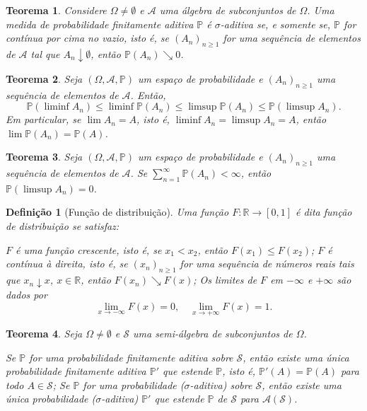 \documentclass[12pt,a4paper,answers]{article}
\numberwithin{equation}{section} %
\renewcommand{\Re}{\mathbb{R}}
\renewcommand{\P}{\mathbb{P}}
\newcommand{\Acal}{\mathcal{A}}
\newcommand{\Scal}{\mathcal{S}}
\theoremstyle{thm_estilo}
\newtheorem{theorem}{Teorema}[section]
\newtheorem{definition}{Definição}[section]
\theoremstyle{thm_note_est}
\begin{document}
\begin{theorem}
	Considere $\Omega \neq \emptyset$ e $\Acal$ uma álgebra de subconjuntos de $\Omega$. Uma medida de probabilidade finitamente aditiva $\P$ é $\sigma$-aditiva se, e somente se, $\P$ for contínua por cima no vazio, isto é, se $(A_n)_{n\geq 1}$ for uma sequência de elementos de $\Acal$ tal que $A_n \downarrow \emptyset$, então $\P(A_n) \searrow 0$.
\end{theorem}

\begin{theorem}
	Seja $(\Omega, \Acal, \P)$ um espaço de probabilidade e $(A_n)_{n\geq 1}$ uma sequência de elementos de $\Acal$. Então,
	\[
	\P(\liminf A_n) \leq \liminf \P(A_n) \leq \limsup \P(A_n) \leq \P(\limsup A_n).
	\]
	Em particular, se $\lim A_n = A$, isto é, $\liminf A_n = \limsup A_n = A$, então $\lim \P(A_n) = \P(A)$.
\end{theorem}

\begin{theorem}
	Seja $(\Omega, \Acal, \P)$ um espaço de probabilidade e $(A_n)_{n\geq 1}$ uma sequência de elementos de $\Acal$. Se $\sum_{n=1}^{\infty} \P(A_n) < \infty$, então $\P(\limsup A_n) = 0$.
\end{theorem}

\begin{definition}[Função de distribuição]
	Uma função $F : \Re \to [0,1]$ é dita função de distribuição se satisfaz:
	\begin{outline}[enumerate]
		\1 $F$ é uma função crescente, isto é, se $x_1 < x_2$, então $F(x_1) \leq F(x_2)$;
		\1 $F$ é contínua à direita, isto é, se $(x_n)_{n\geq 1}$ for uma sequência de números reais tais que $x_n \downarrow x$, $x \in \Re$, então $F(x_n) \searrow F(x)$;
		\1 Os limites de $F$ em $-\infty$ e $+\infty$ são dados por
		\[
		\lim_{x \to -\infty} F(x) = 0, \quad \lim_{x \to +\infty} F(x) = 1.
		\]
	\end{outline}
\end{definition}

\begin{theorem}
	Seja $\Omega \neq \emptyset$ e $\Scal$ uma semi-álgebra de subconjuntos de $\Omega$.
	\begin{outline}[enumerate]
		\1 Se $\P$ for uma probabilidade finitamente aditiva sobre $\Scal$, então existe uma única probabilidade finitamente aditiva $\P'$ que estende $\P$, isto é, $\P'(A) = \P(A)$ para todo $A \in \Scal$;
		\1 Se $\P$ for uma probabilidade ($\sigma$-aditiva) sobre $\Scal$, então existe uma única probabilidade ($\sigma$-aditiva) $\P'$ que estende $\P$ de $\Scal$ para $\Acal(\Scal)$.
	\end{outline}
\end{theorem}
\end{document}
